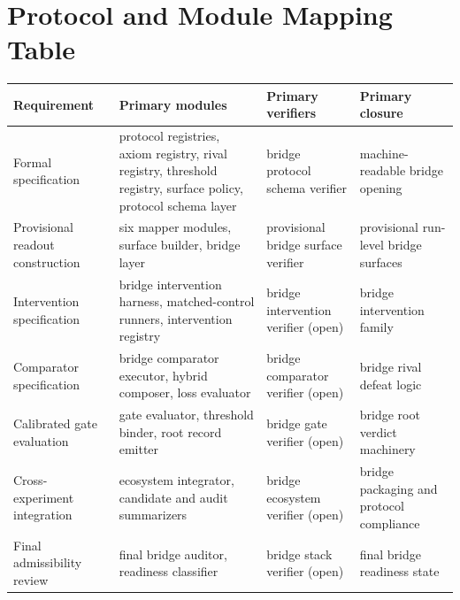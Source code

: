 \documentclass[11pt,a4paper]{article}
\theoremstyle{definition}
\begin{document}
\section{Protocol and Module Mapping Table}
\begin{center}
\small
\begin{tabularx}{\linewidth}{@{}>{\raggedright\arraybackslash}p{}>{\raggedright\arraybackslash}p{}>{\raggedright\arraybackslash}p{}>{\raggedright\arraybackslash}p{}@{}}
\toprule
Requirement & Primary modules & Primary verifiers & Primary closure \\
\midrule
Formal specification & protocol registries, axiom registry, rival registry, threshold registry, surface policy, protocol schema layer & bridge protocol schema verifier & machine-readable bridge opening \\
Provisional readout construction & six mapper modules, surface builder, bridge layer & provisional bridge surface verifier & provisional run-level bridge surfaces \\
Intervention specification & bridge intervention harness, matched-control runners, intervention registry & bridge intervention verifier (open) & bridge intervention family \\
Comparator specification & bridge comparator executor, hybrid composer, loss evaluator & bridge comparator verifier (open) & bridge rival defeat logic \\
Calibrated gate evaluation & gate evaluator, threshold binder, root record emitter & bridge gate verifier (open) & bridge root verdict machinery \\
Cross-experiment integration & ecosystem integrator, candidate and audit summarizers & bridge ecosystem verifier (open) & bridge packaging and protocol compliance \\
Final admissibility review & final bridge auditor, readiness classifier & bridge stack verifier (open) & final bridge readiness state \\
\bottomrule
\end{tabularx}
\end{center}
\end{document}
